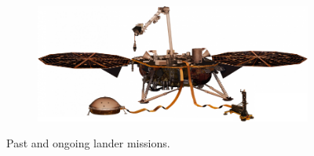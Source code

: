 \begin{figure}[h]
    \begin{subfigure}[t]{\subfigureWidth}
        \centering
		\includegraphics[height=\graphicsHeight]{sections/state-of-the-art/past-missions/images/lander-insight.png}
		\label{fig:sub:past-mission-lander-insight}
	\end{subfigure}
    \caption[Past and ongoing lander missions]
            {Past and ongoing lander missions.}
	\label{fig:past-mission-landers}
\vspace{-2ex}
\end{figure}

